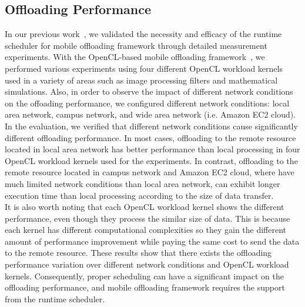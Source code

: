 \documentclass[10pt, conference, compsocconf]{IEEEtran}
\begin{document}
\subsection{Offloading Performance}
%
In our previous work~\cite{ml}, we validated the necessity and efficacy
of the runtime scheduler for mobile offloading framework through
detailed measurement experiments.
%
With the OpenCL-based mobile offloading framework~\cite{ocloff}, we
performed various experiments using four different OpenCL workload
kernels used in a variety of areas such as image processing filters and
mathematical simulations.
%
Also, in order to observe the impact of different network conditions on
the offoading performance, we configured different network conditions:
local area network, campus network, and wide area network (i.e. Amazon
EC2 cloud).
%
In the evaluation, we verified that different network conditions cause
significantly different offloading performance.
%
In most cases, offloading to the remote resource located in local area
network has better performance than local processing in four OpenCL
workload kernels used for the experiments.
%
In contrast, offloading to the remote resource located in campus network
and Amazon EC2 cloud, where have much limited network conditions than
local area network, can exhibit longer execution time than local
processing according to the size of data transfer.\\ 
%
\indent It is also worth noting that each OpenCL workload kernel shows
the different performance, even though they process the similar size of
data.
%
This is because each kernel has different computational complexities so
they gain the different amount of performance improvement while paying
the same cost to send the data to the remote resource.
%
These results show that there exists the offloading performance
variation over different network conditions and OpenCL workload kernels.
%
Consequently, proper scheduling can have a significant impact on the
offloading performance, and mobile offloading framework requires the
support from the runtime scheduler.
%
\end{document}
